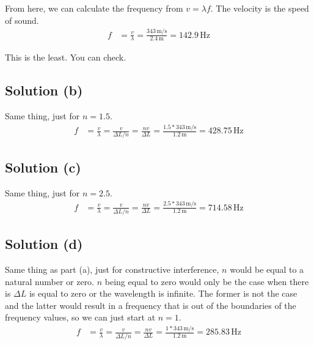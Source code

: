 \documentclass[12pt]{article}
\begin{document}
            From here, we can calculate the frequency from $v = \lambda f$.
            The velocity is the speed of sound.
            \begin{align}
                f   &=  \frac{v}{\lambda}
                    =   \frac{343\,\unit{\meter/\second}}{2.4\,\unit{\meter}}
                    =   \boxed{142.9\,\unit{\hertz}}
            \end{align}

            This is the least. 
            You can check.
        
        \subsection{Solution (b)}
            Same thing, just for $n = 1.5$.
            \begin{align}
                f   &=  \frac{v}{\lambda}
                    =   \frac{v}{\Delta L/n}
                    =   \frac{nv}{\Delta L}
                    =   \frac{1.5 * 343\,\unit{\meter/\second}}{1.2\,\unit{\meter}}
                    =   \boxed{428.75\,\unit{\hertz}}
            \end{align}
        
        \subsection{Solution (c)}
            Same thing, just for $n = 2.5$.
            \begin{align}
                f   &=  \frac{v}{\lambda}
                    =   \frac{v}{\Delta L/n}
                    =   \frac{nv}{\Delta L}
                    =   \frac{2.5 * 343\,\unit{\meter/\second}}{1.2\,\unit{\meter}}
                    =   \boxed{714.58\,\unit{\hertz}}
            \end{align}

        \subsection{Solution (d)}
            Same thing as part (a), just for constructive interference, $n$ would be equal to a natural number or zero.
            $n$ being equal to zero would only be the case when there is $\Delta L$ is equal to zero or the wavelength is infinite.
            The former is not the case and the latter would result in a frequency that is out of the boundaries of the frequency values, so we can just start at $n = 1$.
            \begin{align}
                f   &=  \frac{v}{\lambda}
                    =   \frac{v}{\Delta L/n}
                    =   \frac{nv}{\Delta L}
                    =   \frac{1 * 343\,\unit{\meter/\second}}{1.2\,\unit{\meter}}
                    =   \boxed{285.83\,\unit{\hertz}}
            \end{align}
        
\end{document}

